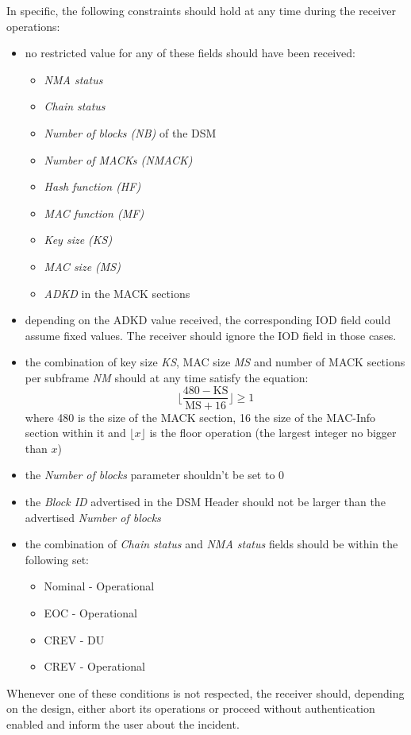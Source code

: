 In specific, the following constraints should hold at any time during the
receiver operations:
\begin{itemize}
  \item no restricted value for any of these fields should have been received:
    \begin{itemize}
      \item \textit{NMA status}
      \item \textit{Chain status}
      \item \textit{Number of blocks (NB)} of the DSM
      \item \textit{Number of MACKs (NMACK)}
      \item \textit{Hash function (HF)}
      \item \textit{MAC function (MF)}
      \item \textit{Key size (KS)}
      \item \textit{MAC size (MS)}
      \item \textit{ADKD} in the MACK sections
    \end{itemize}
  \item depending on the ADKD value received, the corresponding IOD field could
    assume fixed values. The receiver should ignore the IOD field in those cases.
  \item the combination of key size \textit{KS}, MAC size \textit{MS} and number
    of MACK sections per subframe \textit{NM} should at any time satisfy the
    equation:
    \[
      \Big\lfloor \frac{480 - \textrm{KS}}{\textrm{MS} + 16} \Big\rfloor \geq 1
    \]
    where \num{480} is the size of the MACK section, \num{16} the size of the
    MAC-Info section within it and $\lfloor x \rfloor$ is the floor
    operation (the largest integer no bigger than $x$)
  \item the \textit{Number of blocks} parameter shouldn't be set to \num{0}
  \item the \textit{Block ID} advertised in the DSM Header should not be larger
    than the advertised \textit{Number of blocks}
  \item the combination of \textit{Chain status} and \textit{NMA status} fields
    should be within the following set:
    \begin{itemize}
      \item Nominal - Operational
      \item EOC - Operational
      \item CREV - DU
      \item CREV - Operational
    \end{itemize}
\end{itemize}
Whenever one of these conditions is not respected, the receiver should,
depending on the design, either abort its operations or proceed without
authentication enabled and inform the user about the incident.
